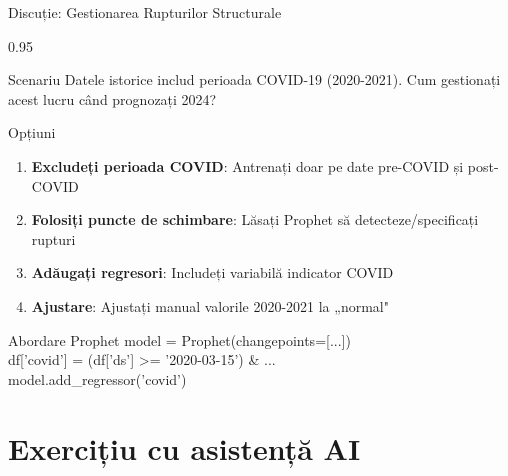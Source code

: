 \documentclass[9pt, aspectratio=169, t]{beamer}
\begin{document}
\begin{frame}{Discuție: Gestionarea Rupturilor Structurale}
    \begin{cminipage}{0.95\textwidth}
    {\small
    \begin{alertblock}{Scenariu}
        Datele istorice includ perioada COVID-19 (2020-2021). Cum gestionați acest lucru când prognozați 2024?
    \end{alertblock}
    \begin{block}{Opțiuni}
        \begin{enumerate}\setlength{\itemsep}{0pt}
            \item \textbf{Excludeți perioada COVID}: Antrenați doar pe date pre-COVID și post-COVID
            \item \textbf{Folosiți puncte de schimbare}: Lăsați Prophet să detecteze/specificați rupturi
            \item \textbf{Adăugați regresori}: Includeți variabilă indicator COVID
            \item \textbf{Ajustare}: Ajustați manual valorile 2020-2021 la „normal"
        \end{enumerate}
    \end{block}
    \begin{exampleblock}{Abordare Prophet}
        {\footnotesize\ttfamily
        model = Prophet(changepoints=[...])\\
        df['covid'] = (df['ds'] >= '2020-03-15') \& ...\\
        model.add\_regressor('covid')
        }
    \end{exampleblock}
    }
    \end{cminipage}
\end{frame}

\section{Exercițiu cu asistență AI}
\end{document}
